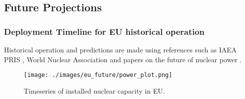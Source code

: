 \subsection{Future Projections}



\begin{frame}
	\frametitle{Deployment Timeline for EU historical operation}
	Historical operation and predictions are made using references such as \gls{IAEA} \gls{PRIS} \cite{iaea_pris_2017},
	World Nuclear Association \cite{world_nuclear_association_nuclear_2017} and papers on the 
	future of nuclear power
	\cite{joskow_future_2012, hatch_politics_2015}.
	\begin{figure}[htbp!]
		\begin{center}
			\texttt{[image: ./images/eu\_future/power\_plot.png]}
		\end{center}
		\caption{Timeseries of installed nuclear capacity in \gls{EU}.}
		\label{fig:eu_pow}
	\end{figure}
	
\end{frame}


